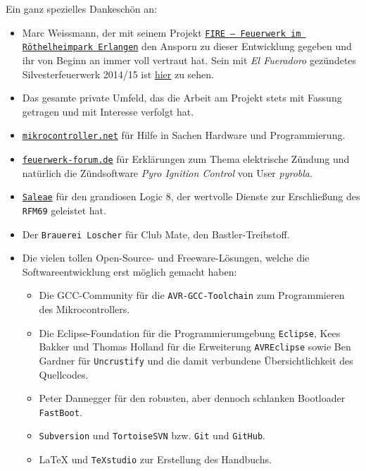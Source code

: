 \documentclass[pdftex, parskip, numbers=noenddot, toc=listof]{scrbook}
\newcommand{\pic}{\emph{Pyro Ignition Control}}
\newcommand{\anlage}{\emph{El Fueradoro}}
\begin{document}
	Ein ganz spezielles Dankeschön an:
	\begin{itemize}
		\item Marc Weissmann, der mit seinem Projekt \href{http://www.facebook.com/FIREErlangen}{\texttt{FIRE -- Feuerwerk im Röthelheimpark Erlangen}} den Ansporn zu dieser Entwicklung gegeben und ihr von Beginn an immer voll vertraut hat. Sein mit {\anlage} gezündetes Silvesterfeuerwerk 2014/15 ist \underline{\href{https://vimeo.com/116115628}{hier}} zu sehen.
		\item Das gesamte private Umfeld, das die Arbeit am Projekt stets mit Fassung getragen und mit Interesse verfolgt hat.
		\item \href{http://www.mikrocontroller.net}{\texttt{mikrocontroller.net}} für Hilfe in Sachen Hardware und Programmierung.
		\item \href{http://www.feuerwerk-forum.de}{\texttt{feuerwerk-forum.de}} für Erklärungen zum Thema elektrische Zündung und natürlich die Zündsoftware {\pic} von User \emph{pyrobla}.
		\item \href{http://www.saleae.com}{\texttt{Saleae}} für den grandiosen Logic 8, der wertvolle Dienste zur Erschließung des \texttt{RFM69} geleistet hat.
		\item Der \texttt{Brauerei Loscher} für Club Mate, den Bastler-Treibstoff.
		\item Die vielen tollen Open-Source- und Freeware-Lösungen, welche die Softwareentwicklung erst möglich gemacht haben:
		      \begin{itemize}
		      	\item Die GCC-Community für die \texttt{AVR-GCC-Toolchain} zum Programmieren des Mikrocontrollers.
		      	\item Die Eclipse-Foundation für die Programmierumgebung \texttt{Eclipse}, Kees Bakker und Thomas Holland für die Erweiterung \texttt{AVREclipse} sowie Ben Gardner für \texttt{Uncrustify} und die damit verbundene Übersichtlichkeit des Quellcodes.
		      	\item Peter Dannegger für den robusten, aber dennoch schlanken Bootloader \texttt{FastBoot}.
		      	\item \texttt{Subversion} und \texttt{TortoiseSVN} bzw. \texttt{Git} und \texttt{GitHub}.
		      	\item {\LaTeX} und \texttt{TeXstudio} zur Erstellung des Handbuchs.
		      \end{itemize}
	\end{itemize}


	\tableofcontents
\end{document}
